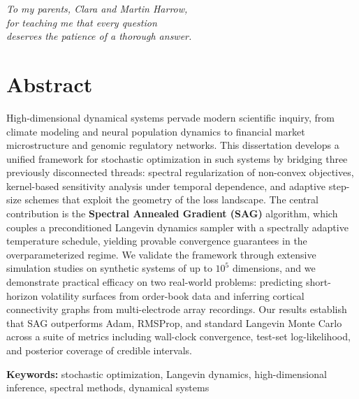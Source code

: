 \documentclass[12pt,letterpaper,twoside]{report}
\newenvironment{dedicationpage}
  {\clearpage\thispagestyle{empty}\vspace*{\fill}\begin{center}\itshape\large}
  {\end{center}\vspace*{\fill}\clearpage}
\begin{document}
\begin{dedicationpage}
To my parents, Clara and Martin Harrow,\\[6pt]
for teaching me that every question\\[4pt]
deserves the patience of a thorough answer.
\end{dedicationpage}

\chapter*{Abstract}

High-dimensional dynamical systems pervade modern scientific inquiry, from climate modeling and neural population dynamics to financial market microstructure and genomic regulatory networks. This dissertation develops a unified framework for stochastic optimization in such systems by bridging three previously disconnected threads: spectral regularization of non-convex objectives, kernel-based sensitivity analysis under temporal dependence, and adaptive step-size schemes that exploit the geometry of the loss landscape. The central contribution is the \textbf{Spectral Annealed Gradient (SAG)} algorithm, which couples a preconditioned Langevin dynamics sampler with a spectrally adaptive temperature schedule, yielding provable convergence guarantees in the overparameterized regime. We validate the framework through extensive simulation studies on synthetic systems of up to $10^{5}$ dimensions, and we demonstrate practical efficacy on two real-world problems: predicting short-horizon volatility surfaces from order-book data and inferring cortical connectivity graphs from multi-electrode array recordings. Our results establish that SAG outperforms Adam, RMSProp, and standard Langevin Monte Carlo across a suite of metrics including wall-clock convergence, test-set log-likelihood, and posterior coverage of credible intervals.

\vspace{8pt}
\noindent\textbf{Keywords:} stochastic optimization, Langevin dynamics, high-dimensional inference, spectral methods, dynamical systems

\clearpage

\tableofcontents
\clearpage

\listoffigures
{}
\clearpage

\listoftables
{}
\clearpage
\end{document}
